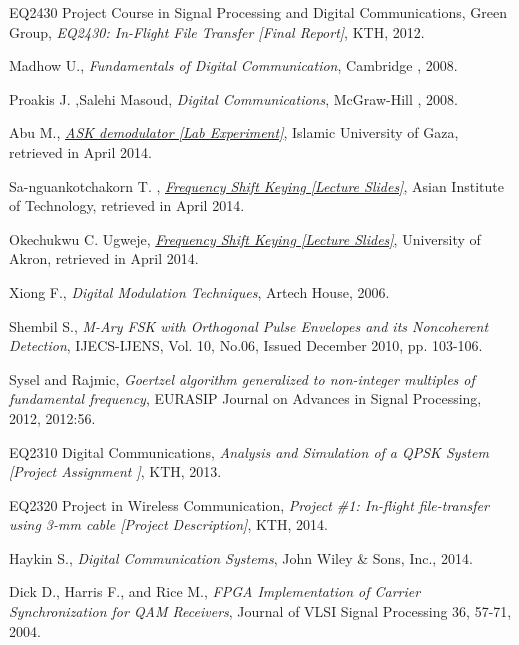\documentclass[12pt,a4paper,openright]{report}
\begin{document}
\begin{thebibliography}{1}
EQ2430 Project Course in Signal Processing and Digital Communications, Green Group, \emph{EQ2430: In-Flight File Transfer  [Final Report]}, KTH, 2012.


Madhow U., \emph{Fundamentals of Digital Communication}, Cambridge , 2008.

Proakis J. ,Salehi Masoud, \emph{Digital Communications}, McGraw-Hill , 2008.

Abu M., \href{http://site.iugaza.edu.ps/mabufoul/files/2010/09/Experiment-5.pdf}
{\emph{ASK demodulator [Lab Experiment]}},
Islamic University of Gaza, retrieved in April 2014.


Sa-nguankotchakorn T. , \href{http://www.tc.ait.ac.th/faculty/teerapat/AT77.11_Digital\%20Modulation\%20Techniques/III.Frequency_Shift_Keying.pdf}{\emph{Frequency Shift Keying [Lecture Slides]}}, Asian Institute of Technology, retrieved in April 2014.


Okechukwu C. Ugweje, \href{ugweje/web/Courses/Ee549/Handout/EE549F01Lecture37.pdf}{\emph{Frequency Shift Keying [Lecture Slides]}},  University of Akron, retrieved in April 2014.


Xiong F., \emph{Digital Modulation Techniques}, Artech House, 2006.

Shembil S., \emph{M-Ary FSK with Orthogonal Pulse Envelopes and its Noncoherent Detection}, IJECS-IJENS, Vol. 10, No.06, Issued December 2010, pp. 103-106.

Sysel and Rajmic, \emph{Goertzel algorithm generalized to non-integer multiples of fundamental frequency}, EURASIP Journal on Advances in Signal Processing, 2012, 2012:56.

EQ2310 Digital Communications, \emph{Analysis and Simulation of a QPSK System [Project Assignment ]}, KTH, 2013.

EQ2320 Project in Wireless Communication, \emph{Project \#1: In-flight file-transfer using 3-mm cable [Project Description]}, KTH, 2014.

Haykin S., \emph{Digital Communication Systems}, John Wiley \& Sons, Inc., 2014.

Dick D., Harris F., and Rice M., \emph{FPGA Implementation of Carrier Synchronization for QAM Receivers}, Journal of VLSI Signal Processing 36, 57-71, 2004.


\end{thebibliography}
\end{document}
